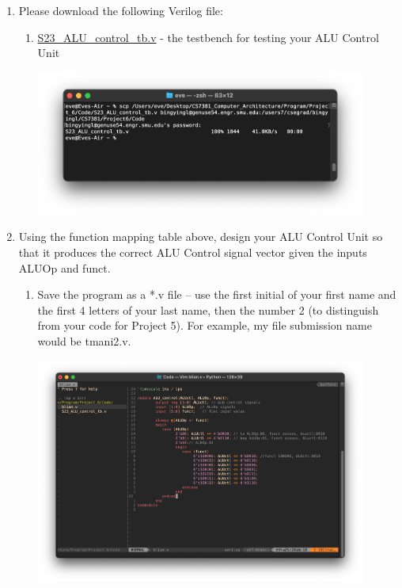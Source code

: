 \documentclass[12pt]{article}
\begin{document}
        \begin{enumerate}
            \item Please download the following Verilog file:
            \begin{enumerate}
                \item \href{https://smu.instructure.com/courses/106177/files/7254963?wrap=1}{S23\_ALU\_control\_tb.v} - the testbench for testing your ALU Control Unit
                        \begin{center}
        \includegraphics[width=0.9\textwidth]{p2.png}
        \end{center}
            \end{enumerate}
            \item Using the function mapping table above, design your ALU Control Unit so that it produces the correct ALU Control signal vector given the inputs ALUOp and funct.
            \begin{enumerate}
                \item Save the program as a *.v file – use the first initial of your first name and the first 4 letters of your last name, then the number 2 (to distinguish from your code for Project 5). For example, my file submission name would be tmani2.v.
                                        \begin{center}
        \includegraphics[width=0.9\textwidth]{p3.png}

\end{center}
\end{enumerate}
\end{enumerate}
\end{document}
